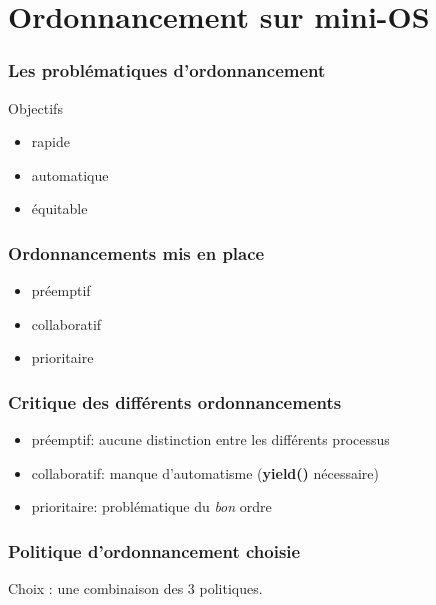 \documentclass{beamer}
\begin{document}
\section{Ordonnancement sur mini-OS}

\begin{frame}
    \frametitle{Les problématiques d'ordonnancement}
    \begin{center}
        \huge Objectifs
    \end{center}
    \begin{itemize}
        \item<2-> rapide
        \item<3-> automatique
        \item<4-> équitable
    \end{itemize}
\end{frame}

\begin{frame}
    \frametitle{Ordonnancements mis en place}
    \begin{itemize}
        \item<2-> préemptif
        \item<3-> collaboratif
        \item<4-> prioritaire
    \end{itemize}
\end{frame}

\begin{frame}
    \frametitle{Critique des différents ordonnancements}
    \begin{itemize}
        \item préemptif: aucune distinction entre les différents processus
        \item collaboratif: manque d'automatisme (\textbf{yield()} nécessaire)
        \item prioritaire: problématique du \emph{bon} ordre
    \end{itemize}
\end{frame}

\begin{frame}
    \frametitle{Politique d'ordonnancement choisie}
    \begin{center}
        \huge Choix : une combinaison des 3 politiques.
    \end{center}
\end{frame}
\end{document}
